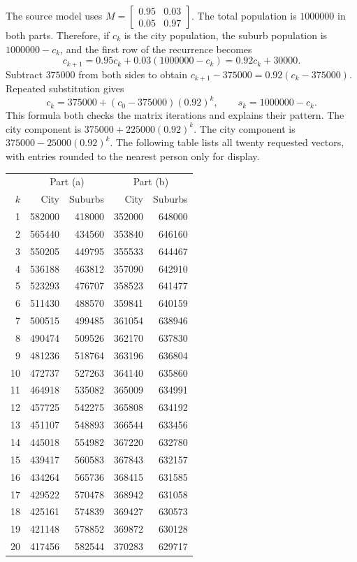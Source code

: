 The source model uses
$M=\begin{bmatrix}0.95&0.03\\0.05&0.97\end{bmatrix}$.
The total population is $1000000$ in both parts. Therefore, if $c_k$
is the city population, the suburb population is $1000000-c_k$,
and the first row of the recurrence becomes
\[
 c_{k+1}=0.95c_k+0.03(1000000-c_k)=0.92c_k+30000.
\]
Subtract $375000$ from both sides to obtain
$c_{k+1}-375000=0.92(c_k-375000)$. Repeated substitution gives
\[
 c_k=375000+(c_0-375000)(0.92)^k,\qquad s_k=1000000-c_k.
\]
This formula both checks the matrix iterations and explains their pattern.
The city component is $375000+225000(0.92)^k$.
The city component is $375000-25000(0.92)^k$.
The following table lists all twenty requested vectors, with entries
rounded to the nearest person only for display.
\begin{center}
\begin{tabular}{r|rr|rr}
 &\multicolumn{2}{c|}{Part (a)}&\multicolumn{2}{c}{Part (b)}\\
$k$&City&Suburbs&City&Suburbs\\\hline

1&582000&418000&352000&648000\\
2&565440&434560&353840&646160\\
3&550205&449795&355533&644467\\
4&536188&463812&357090&642910\\
5&523293&476707&358523&641477\\
6&511430&488570&359841&640159\\
7&500515&499485&361054&638946\\
8&490474&509526&362170&637830\\
9&481236&518764&363196&636804\\
10&472737&527263&364140&635860\\
11&464918&535082&365009&634991\\
12&457725&542275&365808&634192\\
13&451107&548893&366544&633456\\
14&445018&554982&367220&632780\\
15&439417&560583&367843&632157\\
16&434264&565736&368415&631585\\
17&429522&570478&368942&631058\\
18&425161&574839&369427&630573\\
19&421148&578852&369872&630128\\
20&417456&582544&370283&629717\\

\end{tabular}\end{center}
